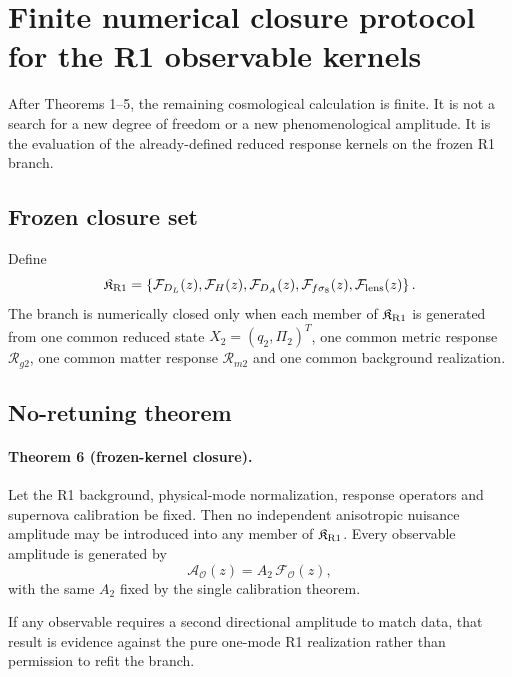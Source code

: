 \section{Finite numerical closure protocol for the R1 observable kernels}
\label{sec:bhsm-kernel-closure}

After Theorems 1--5, the remaining cosmological calculation is finite.  It is
not a search for a new degree of freedom or a new phenomenological amplitude.
It is the evaluation of the already-defined reduced response kernels on the
frozen R1 branch.

\subsection{Frozen closure set}

Define
\begin{equation}
\mathfrak K_{\rm R1}
=
\left\{
\mathcal F_{D_L}(z),
\mathcal F_H(z),
\mathcal F_{D_A}(z),
\mathcal F_{f\sigma_8}(z),
\mathcal F_{\rm lens}(z)
\right\}.
\end{equation}
The branch is numerically closed only when each member of
$\mathfrak K_{\rm R1}$ is generated from one common reduced state
$X_2=(q_2,\Pi_2)^T$, one common metric response $\mathcal R_{g2}$, one common
matter response $\mathcal R_{m2}$ and one common background realization.

\subsection{No-retuning theorem}

\paragraph{Theorem 6 (frozen-kernel closure).}
Let the R1 background, physical-mode normalization, response operators and
supernova calibration be fixed.  Then no independent anisotropic nuisance
amplitude may be introduced into any member of $\mathfrak K_{\rm R1}$.
Every observable amplitude is generated by
\begin{equation}
\mathcal A_{\mathcal O}(z)
=
A_2\,\mathcal F_{\mathcal O}(z),
\end{equation}
with the same $A_2$ fixed by the single calibration theorem.

If any observable requires a second directional amplitude to match data,
that result is evidence against the pure one-mode R1 realization rather than
permission to refit the branch.

